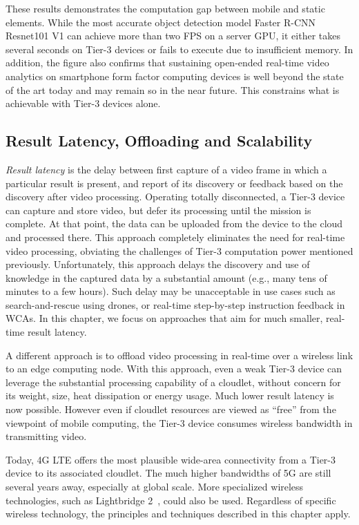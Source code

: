 These results demonstrates the computation gap between mobile and static
elements. While the most accurate object detection model Faster R-CNN Resnet101
V1 can achieve more than two FPS on a server GPU, it either takes several
seconds on Tier-3 devices or fails to execute due to insufficient memory. In
addition, the figure also confirms that sustaining open-ended real-time video
analytics on smartphone form factor computing devices is well beyond the state
of the art today and may remain so in the near future.  This constrains what is
achievable with Tier-3 devices alone.

\subsection{Result Latency, Offloading and Scalability}
\label{bw:offloading}

{\em Result latency} is the delay between first capture of a video frame in
which a particular result is present, and report of its discovery or feedback
based on the discovery after video processing. Operating totally disconnected, a
Tier-3 device can capture and store video, but defer its processing until the
mission is complete.  At that point, the data can be uploaded from the device to
the cloud and processed there.  This approach completely eliminates the need for
real-time video processing, obviating the challenges of Tier-3 computation power
mentioned previously. Unfortunately, this approach delays the discovery and use
of knowledge in the captured data by a substantial amount (e.g., many tens of
minutes to a few hours).  Such delay may be unacceptable in use cases such as
search-and-rescue using drones, or real-time step-by-step instruction feedback
in WCAs. In this chapter, we focus on approaches that aim for much smaller,
real-time result latency.

A different approach is to offload video processing in real-time over a wireless
link to an edge computing node. With this approach, even a weak Tier-3 device
can leverage the substantial processing capability of a cloudlet, without
concern for its weight, size, heat dissipation or energy usage.  Much lower
result latency is now possible.  However even if cloudlet resources are viewed
as ``free'' from the viewpoint of mobile computing, the Tier-3 device consumes
wireless bandwidth in transmitting video.

Today, 4G LTE offers the most plausible wide-area connectivity from a Tier-3
device to its associated cloudlet. The much higher bandwidths of 5G are still
several years away, especially at global scale.  More specialized wireless
technologies, such as Lightbridge 2~\cite{LightBridge2}, could also
be used. Regardless of specific wireless technology, the principles and
techniques described in this chapter apply.

